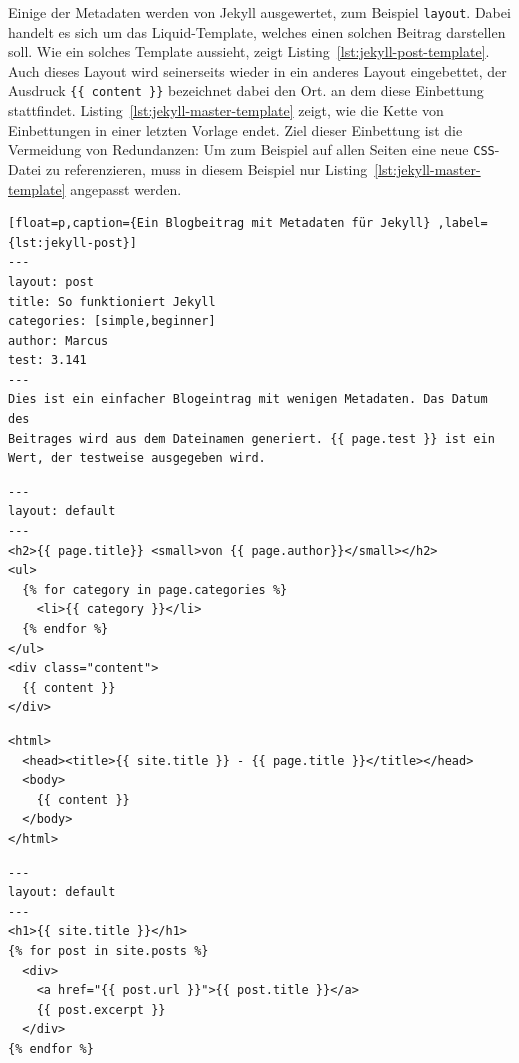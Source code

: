 Einige der Metadaten werden von Jekyll ausgewertet, zum Beispiel \texttt{layout}. Dabei handelt es sich um das Liquid-Template, welches einen solchen Beitrag darstellen soll. Wie ein solches Template aussieht, zeigt Listing~\ref{lst:jekyll-post-template}. Auch dieses Layout wird seinerseits wieder in ein anderes Layout eingebettet, der Ausdruck \texttt{\{\{ content \}\}} bezeichnet dabei den Ort. an dem diese Einbettung stattfindet. Listing~\ref{lst:jekyll-master-template} zeigt, wie die Kette von Einbettungen in einer letzten Vorlage endet. Ziel dieser Einbettung ist die Vermeidung von Redundanzen: Um zum Beispiel auf allen Seiten eine neue \texttt{CSS}-Datei zu referenzieren, muss in diesem Beispiel nur Listing~\ref{lst:jekyll-master-template} angepasst werden.

\begin{lstlisting}[float=p,caption={Ein Blogbeitrag mit Metadaten für Jekyll} ,label={lst:jekyll-post}]
---
layout: post
title: So funktioniert Jekyll
categories: [simple,beginner]
author: Marcus
test: 3.141
---
Dies ist ein einfacher Blogeintrag mit wenigen Metadaten. Das Datum des
Beitrages wird aus dem Dateinamen generiert. {{ page.test }} ist ein
Wert, der testweise ausgegeben wird.
\end{lstlisting}

\begin{lstlisting}[float=p,caption={Beispieltemplate für Blogbeiträge für Jekyll}, label={lst:jekyll-post-template}]
---
layout: default
---
<h2>{{ page.title}} <small>von {{ page.author}}</small></h2>
<ul>
  {% for category in page.categories %}
    <li>{{ category }}</li>
  {% endfor %}
</ul>
<div class="content">
  {{ content }}
</div>
\end{lstlisting}

\begin{lstlisting}[float=p,caption={Template mit \texttt{HTML}-Rumpf für Jekyll}, label={lst:jekyll-master-template}]
<html>
  <head><title>{{ site.title }} - {{ page.title }}</title></head>
  <body>
    {{ content }}
  </body>
</html>
\end{lstlisting}

\begin{lstlisting}[float=p,caption={Hauptseite mit Auszügen aller Beiträge für Jekyll}, label={lst:jekyll-main-page}]
---
layout: default
---
<h1>{{ site.title }}</h1>
{% for post in site.posts %}
  <div>
    <a href="{{ post.url }}">{{ post.title }}</a>
    {{ post.excerpt }}
  </div>
{% endfor %}
\end{lstlisting}

